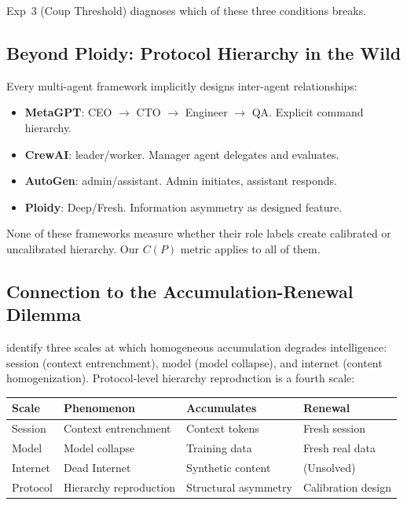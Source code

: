 \documentclass[11pt]{article}
\theoremstyle{definition}
\begin{document}
Exp~3 (Coup Threshold) diagnoses which of these three conditions breaks.

\subsection{Beyond Ploidy: Protocol Hierarchy in the Wild}

Every multi-agent framework implicitly designs inter-agent relationships:

\begin{itemize}[nosep]
    \item \textbf{MetaGPT}: CEO $\to$ CTO $\to$ Engineer $\to$ QA. Explicit command hierarchy.
    \item \textbf{CrewAI}: leader/worker. Manager agent delegates and evaluates.
    \item \textbf{AutoGen}: admin/assistant. Admin initiates, assistant responds.
    \item \textbf{Ploidy}: Deep/Fresh. Information asymmetry as designed feature.
\end{itemize}

None of these frameworks measure whether their role labels create calibrated or uncalibrated hierarchy. Our $C(P)$ metric applies to all of them.

\subsection{Connection to the Accumulation-Renewal Dilemma}

\citet{yoon2026ploidy} identify three scales at which homogeneous accumulation degrades intelligence: session (context entrenchment), model (model collapse), and internet (content homogenization). Protocol-level hierarchy reproduction is a fourth scale:

\begin{table}[h]
\centering
\small
\begin{tabular}{@{}llll@{}}
\toprule
\textbf{Scale} & \textbf{Phenomenon} & \textbf{Accumulates} & \textbf{Renewal} \\
\midrule
Session  & Context entrenchment  & Context tokens     & Fresh session \\
Model    & Model collapse        & Training data      & Fresh real data \\
Internet & Dead Internet         & Synthetic content  & (Unsolved) \\
Protocol & Hierarchy reproduction & Structural asymmetry & Calibration design \\
\bottomrule
\end{tabular}
\end{table}
\end{document}
